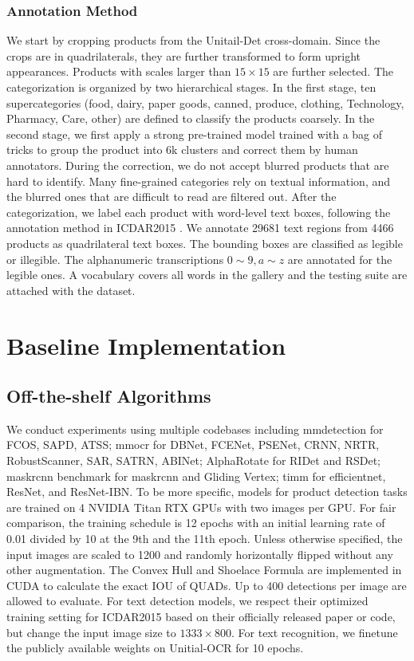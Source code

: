 \documentclass[runningheads]{llncs}
\begin{document}
\subsubsection{Annotation Method}
We start by cropping products from the Unitail-Det cross-domain. Since the crops are in quadrilaterals, they are further transformed to form upright appearances. Products with scales larger than $15 \times 15$ are further selected. The categorization is organized by two hierarchical stages. In the first stage, ten supercategories (food, dairy, paper goods, canned, produce, clothing, Technology, Pharmacy, Care, other) are defined to classify the products coarsely. In the second stage, we first apply a strong pre-trained model trained with a bag of tricks to group the product into 6k clusters and correct them by human annotators. During the correction, we do not accept blurred products that are hard to identify. Many fine-grained categories rely on textual information, and the blurred ones that 
are difficult to read are filtered out. After the categorization, we label each product with word-level text boxes, following the annotation method in ICDAR2015 \cite{ICDAR15}. We annotate 29681 text regions from 4466 products as quadrilateral text boxes. The bounding boxes are classified as legible or illegible. The alphanumeric transcriptions $0\sim 9, a\sim z$ are annotated for the legible ones. A vocabulary covers all words in the gallery and the testing suite are attached with the dataset.

\section{Baseline Implementation}
\subsection{Off-the-shelf Algorithms}
We conduct experiments using multiple codebases including mmdetection \cite{mmdetection} for FCOS, SAPD, ATSS; mmocr \cite{mmocr2021} for DBNet, FCENet, PSENet, CRNN, NRTR, RobustScanner, SAR, SATRN, ABINet; AlphaRotate \cite{yang2021alpharotate} for RIDet and RSDet; maskrcnn benchmark\cite{massa2018maskrcnn_benchmark} for maskrcnn and Gliding Vertex; timm \cite{rw2019timm} for efficientnet, ResNet, and ResNet-IBN. To be more specific, models for product detection tasks are trained on 4 NVIDIA Titan RTX GPUs with two images per GPU. For fair comparison, the training schedule is 12 epochs with an initial learning rate of 0.01 divided by 10 at the 9th and the 11th epoch. Unless otherwise specified, the input images are scaled to 1200 and randomly horizontally flipped without any other augmentation. The Convex Hull and Shoelace Formula are implemented in CUDA to calculate the exact IOU of QUADs. Up to 400 detections per image are allowed to evaluate. For text detection models, we respect their optimized training setting for ICDAR2015 based on their officially released paper or code, but change the input image size to $1333 \times 800$. For text recognition, we finetune the publicly available weights on Unitial-OCR for 10 epochs.
\end{document}
